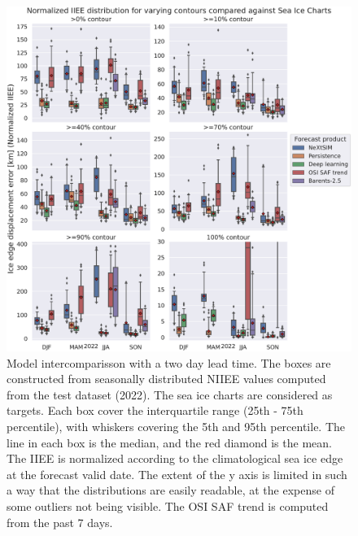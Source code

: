 \documentclass[../main/thesis.tex]{subfiles}
\begin{document}
\begin{figure}
    \centering
    \includegraphics[width=\textwidth]{model_intercomparisson.pdf}
    \caption{\label{fig:model_compare}Model intercomparisson with a two day lead time. The boxes are constructed from seasonally distributed NIIEE values computed from the test dataset (2022). The sea ice charts are considered as targets. Each box cover the interquartile range (25th - 75th percentile), with whiskers covering the 5th and 95th percentile. The line in each box is the median, and the red diamond is the mean. The IIEE is normalized according to the climatological sea ice edge at the forecast valid date. The extent of the y axis is limited in such a way that the distributions are easily readable, at the expense of some outliers not being visible. The OSI SAF trend is computed from the past 7 days.}
\end{figure}
\end{document}
